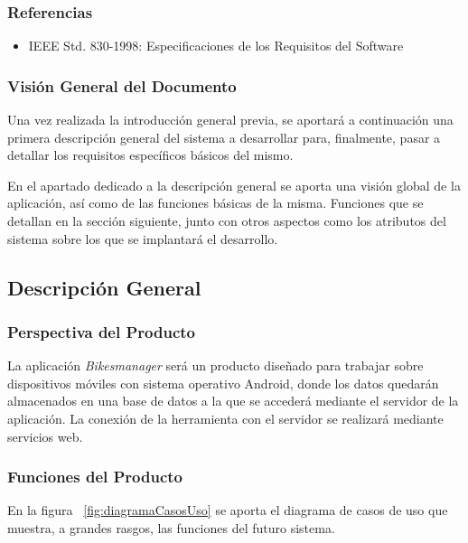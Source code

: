 \subsubsection{Referencias}

\begin{itemize}
	\item IEEE Std. 830-1998: Especificaciones de los Requisitos del Software
\end{itemize}

\subsubsection{Visión General del Documento}

Una vez realizada la introducción general previa, se aportará a continuación una primera descripción general del sistema a desarrollar para, finalmente, pasar a detallar los requisitos específicos básicos del mismo.

En el apartado dedicado a la descripción general se aporta una visión global de la aplicación, así como de las funciones básicas de la misma. Funciones que se detallan en la sección siguiente, junto con otros aspectos como los atributos del sistema sobre los que se implantará el desarrollo.

\subsection{Descripción General}

\subsubsection{Perspectiva del Producto}

La aplicación \emph{Bikesmanager} será un producto diseñado para trabajar sobre dispositivos móviles con sistema operativo Android, donde los datos quedarán almacenados en una base de datos a la que se accederá mediante el servidor de la aplicación. La conexión de la herramienta con el servidor se realizará mediante servicios web.

\subsubsection{Funciones del Producto}

En la figura ~\ref{fig:diagramaCasosUso} se aporta el diagrama de casos de uso que muestra, a grandes rasgos, las funciones del futuro sistema.

